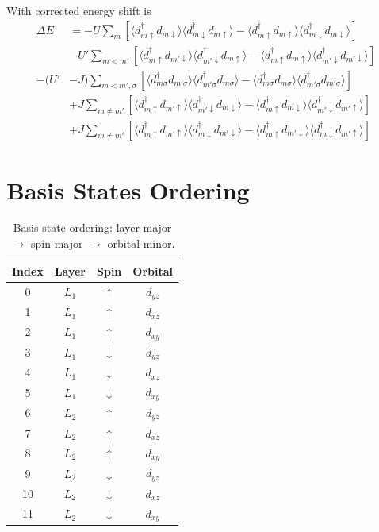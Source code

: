 \documentclass[11pt]{article}
\begin{document}
With corrected energy shift is 
\begin{align}
    \Delta E &= -U \sum_m \left[\langle d^\dagger_{m\uparrow}d_{m\downarrow}\rangle \langle d^\dagger_{m\downarrow}d_{m\uparrow} \rangle
    - \langle d^\dagger_{m\uparrow}d_{m\uparrow}\rangle \langle d^\dagger_{m\downarrow}d_{m\downarrow} \rangle \right]\\\nonumber
    &-U' \sum_{m < m'}\left[\langle d^\dagger_{m\uparrow} d_{m'\downarrow} \rangle\langle d^\dagger_{m'\downarrow}d_{m\uparrow}\rangle
    - \langle d^\dagger_{m\uparrow}d_{m\uparrow}\rangle \langle d^\dagger_{m'\downarrow}d_{m'\downarrow}\rangle\right] \\\nonumber
    -(U'&-J)\sum_{m < m', \sigma} \left[
         \langle d^\dagger_{m\sigma}d_{m'\sigma} \rangle \langle d^\dagger_{m' \sigma}d_{m\sigma} \rangle
         - \langle d^\dagger_{m\sigma}d_{m\sigma}\rangle \langle d^\dagger_{m'\sigma}d_{m'\sigma}\rangle
        \right] \\\nonumber
    &+ J\sum_{m\neq m'} \left[
        \langle d^\dagger_{m\uparrow} d_{m'\uparrow} \rangle 
        \langle d^\dagger_{m'\downarrow} d_{m\downarrow}\rangle
        -\langle d^\dagger_{m\uparrow} d_{m\downarrow}\rangle 
        \langle d^\dagger_{m'\downarrow} d_{m'\uparrow}\rangle
    \right] \\\nonumber
    &+ J\sum_{m\neq m'}\left[
        \langle d^\dagger_{m\uparrow} d_{m'\uparrow}\rangle 
        \langle d^\dagger_{m\downarrow} d_{m'\downarrow} \rangle
        - \langle d^\dagger_{m\uparrow} d_{m' \downarrow} \rangle
        \langle d^\dagger_{m\downarrow}d_{m'\uparrow}\rangle
    \right]
\end{align}


\section{Basis States Ordering}
\begin{table}[h]
\centering
\begin{tabular}{cccc}
\hline
\textbf{Index} & \textbf{Layer} & \textbf{Spin} & \textbf{Orbital} \\
\hline
0  & $L_1$ & $\uparrow$ & $d_{yz}$ \\
1  & $L_1$ & $\uparrow$ & $d_{xz}$ \\
2  & $L_1$ & $\uparrow$ & $d_{xy}$ \\
3  & $L_1$ & $\downarrow$ & $d_{yz}$ \\
4  & $L_1$ & $\downarrow$ & $d_{xz}$ \\
5  & $L_1$ & $\downarrow$ & $d_{xy}$ \\
6  & $L_2$ & $\uparrow$ & $d_{yz}$ \\
7  & $L_2$ & $\uparrow$ & $d_{xz}$ \\
8  & $L_2$ & $\uparrow$ & $d_{xy}$ \\
9  & $L_2$ & $\downarrow$ & $d_{yz}$ \\
10 & $L_2$ & $\downarrow$ & $d_{xz}$ \\
11 & $L_2$ & $\downarrow$ & $d_{xy}$ \\
\hline
\end{tabular}
\caption{Basis state ordering: layer-major $\to$ spin-major $\to$ orbital-minor.}
\label{tab:basis_ordering}
\end{table}
\end{document}
